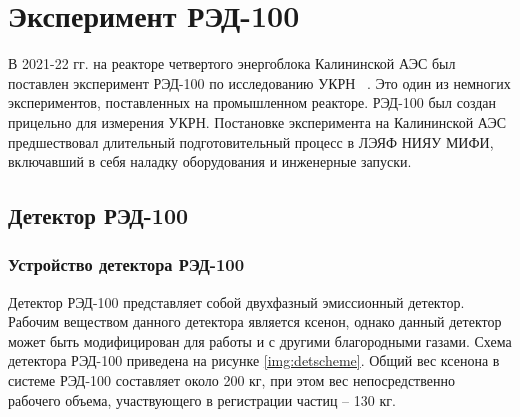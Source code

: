\chapter{Эксперимент РЭД-100} 
\label{chapt2}
В 2021-22 гг. на реакторе четвертого энергоблока Калининской АЭС был поставлен эксперимент РЭД-100 по исследованию УКРН ~\cite{The_RED100_Experiment}. Это один из немногих экспериментов, поставленных на промышленном реакторе. РЭД-100 был создан прицельно для измерения УКРН. Постановке эксперимента на Калининской АЭС предшествовал длительный подготовительный процесс в ЛЭЯФ НИЯУ МИФИ, включавший в себя наладку оборудования и инженерные запуски. 
\section{Детектор РЭД-100}
\label{sect2_1}
\subsection{Устройство детектора РЭД-100}
\label{subsect2_1_1}
Детектор РЭД-100 представляет собой двухфазный эмиссионный детектор. Рабочим веществом данного детектора является ксенон, однако данный детектор может быть модифицирован для работы и с другими благородными газами. Схема детектора РЭД-100 приведена на рисунке \ref{img:detscheme}. Общий вес ксенона в системе РЭД-100 составляет около 200 кг, при этом вес непосредственно рабочего объема, участвующего в регистрации частиц -- 130 кг. 
